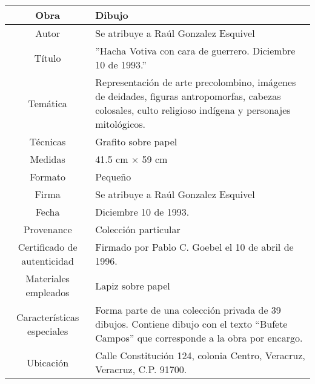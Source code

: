 \begin{table}[H]
\centering
\begin{tabular}{|c|m{}|}
\hline
Obra& Dibujo	\\
\hline
Autor & Se atribuye a Ra\'ul Gonzalez Esquivel\\
\hline
T\'itulo & ''Hacha Votiva con cara de guerrero. Diciembre 10 de 1993.'' \\
\hline
Tem\'atica & Representaci\'on de arte precolombino, im\'agenes de deidades, figuras antropomorfas, cabezas colosales, culto religioso ind\'igena y personajes mitol\'ogicos.\\
\hline
T\'ecnicas &Grafito sobre papel \\
\hline
Medidas & 41.5 cm $\times$ 59 cm \\
\hline
 Formato & Peque\~no \\
 \hline
 Firma & Se atribuye a Ra\'ul Gonzalez Esquivel\\ 
 \hline
  Fecha & Diciembre 10 de 1993. \\
 \hline
 Provenance & Colecci\'on particular\\
 \hline
 Certificado de autenticidad& Firmado por Pablo C. Goebel el 10 de abril de 1996.  \\
 \hline 
  Materiales empleados & Lapiz sobre papel\\
 \hline
 Caracter\'isticas especiales & Forma parte de una colecci\'on privada de 39 dibujos. 
Contiene dibujo con el texto ``Bufete Campos'' que corresponde a la obra por encargo. \\
\hline 
Ubicaci\'on & Calle Constituci\'on 124, colonia Centro, Veracruz, Veracruz, C.P. 91700.\\
\hline

\end{tabular}
\end{table}

